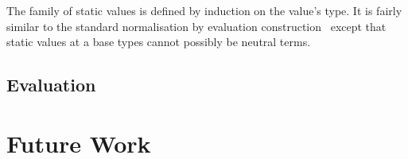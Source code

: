 \documentclass{article}
\begin{document}

The family of static values is defined by induction on
the value's type. It is fairly similar to the standard
normalisation by evaluation
construction~\cite{DBLP:conf/lics/BergerS91,DBLP:journals/mscs/CoquandD97,DBLP:journals/lisp/Coquand02}
except that static values at a base types cannot possibly
be neutral terms.

\begin{AgdaSuppressSpace}
\end{AgdaSuppressSpace}






\subsection{Evaluation}




\begin{AgdaSuppressSpace}
\end{AgdaSuppressSpace}


\section{Future Work}

\cite{DBLP:journals/lisp/Coquand02}

\newpage
\printbibliography
\end{document}
